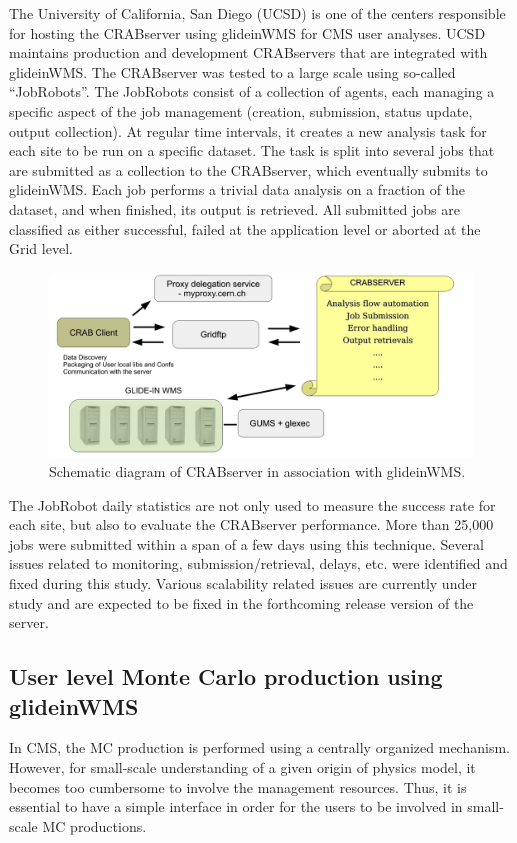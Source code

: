 \documentclass[a4paper]{jpconf}
\begin{document}
The University of California, San Diego (UCSD) is one of the centers responsible for hosting 
the CRABserver using glideinWMS for CMS user analyses. UCSD maintains production and development CRABservers 
that are integrated with glideinWMS. The CRABserver was tested to a large 
scale using so-called ``JobRobots''. The JobRobots consist of a collection of agents, each 
managing a specific aspect of the job management (creation, submission, status
update, output collection). At regular time intervals, it creates a new analysis task
for each site to be run on a specific dataset. The
task is split into several jobs that are submitted as a collection to
the CRABserver, which eventually submits to glideinWMS. Each job
performs a trivial data analysis on a fraction of the dataset, and when
finished, its output is retrieved. All submitted jobs are classified
as either successful, failed at the application level or aborted at the Grid
level.
\begin{figure}
\begin{center}
\includegraphics[scale=0.4]{crabserver}
\end{center}
\caption{Schematic diagram of CRABserver in association with glideinWMS.}
\label{fig:crabserver}
\end{figure}
The JobRobot daily statistics are not only used to measure the success rate for each site, 
but also to evaluate the CRABserver performance. More than 25,000 jobs were submitted within a span of a 
few days using this technique. Several issues related to monitoring, 
submission/retrieval, delays, etc. were identified and fixed during this study. Various scalability
related issues are currently under study and are expected to be fixed in the forthcoming
release version of the server.
\subsection{User level Monte Carlo production using glideinWMS}
In CMS, the MC production is performed using a centrally organized mechanism. However,
for small-scale understanding of a given origin of physics model, it becomes too cumbersome
to involve the management resources. Thus, it is essential to have a simple interface
in order for the users to be involved in small-scale MC productions. 
\end{document}
